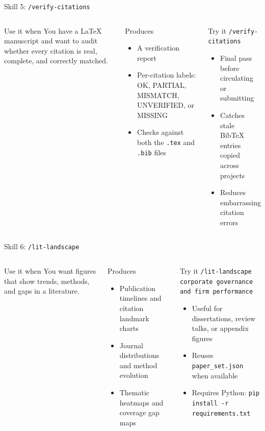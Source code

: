 \documentclass[aspectratio=169,professionalfonts]{beamer}
\begin{document}
\begin{frame}[t]{Skill 5: \texttt{/verify-citations}}
\small
\begin{columns}[T,onlytextwidth]
\begin{block}{Use it when}
You have a LaTeX manuscript and want to audit whether every citation is real, complete, and correctly matched.
\end{block}
\begin{block}{Produces}
\begin{itemize}
  \item A verification report
  \item Per-citation labels: OK, PARTIAL, MISMATCH, UNVERIFIED, or MISSING
  \item Checks against both the \texttt{.tex} and \texttt{.bib} files
\end{itemize}
\end{block}
\begin{exampleblock}{Try it}
\texttt{/verify-citations}
\medskip
\begin{itemize}
  \item Final pass before circulating or submitting
  \item Catches stale BibTeX entries copied across projects
  \item Reduces embarrassing citation errors
\end{itemize}
\end{exampleblock}
\end{columns}
\end{frame}

\begin{frame}[t]{Skill 6: \texttt{/lit-landscape}}
\small
\begin{columns}[T,onlytextwidth]
\begin{block}{Use it when}
You want figures that show trends, methods, and gaps in a literature.
\end{block}
\begin{block}{Produces}
\begin{itemize}
  \item Publication timelines and citation landmark charts
  \item Journal distributions and method evolution
  \item Thematic heatmaps and coverage gap maps
\end{itemize}
\end{block}
\begin{exampleblock}{Try it}
{\small\texttt{/lit-landscape corporate governance and firm performance}}
\medskip
\begin{itemize}
  \item Useful for dissertations, review talks, or appendix figures
  \item Reuses \texttt{paper\_set.json} when available
  \item Requires Python: \texttt{pip install -r requirements.txt}
\end{itemize}
\end{exampleblock}
\end{columns}
\end{frame}
\end{document}
